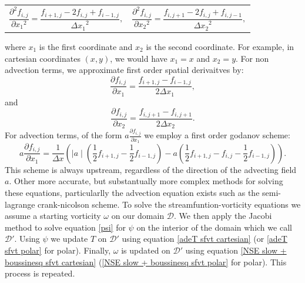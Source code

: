 \documentclass{article}
\begin{document}
\begin{tabularx}{\textwidth}{XX}
\begin{equation}
	\frac{\partial^2 f_{i,j}}{\partial {x_1}^2} = \frac{f_{i+1,j} - 2 f_{i,j} + f_{i-1,j}}{{\Delta x_1}^2},
\end{equation}
    &
\begin{equation}
	\frac{\partial^2 f_{i,j}}{\partial {x_2}^2} = \frac{f_{i,j+1} - 2 f_{i,j} + f_{i,j-1}}{{\Delta x_2}^2},
\end{equation}
\end{tabularx}\par
where $x_1$ is the first coordinate and $x_2$ is the second coordinate. For example, in cartesian coordinates $(x,y)$, we would have $x_1=x$ and $x_2=y$. 
For non advection terms, we approximate first order spatial derivaitves by:
\begin{equation}
	\frac{\partial f_{i,j}}{\partial x_1} = \frac{f_{i+1,j} - f_{i-1,j}}{2{\Delta x_1}},
\end{equation}
and
\begin{equation}
	\frac{\partial f_{i,j}}{\partial x_2} = \frac{f_{i,j+1} - f_{i,j+1}}{2{\Delta x_2}}.
\end{equation}
For advection terms, of the form $a \frac{\partial f_{i,j}}{\partial x_1}$ we employ a first order godanov scheme:
\begin{equation}
	a \frac{\partial f_{i,j}}{\partial x_1} = \frac{1}{\Delta x} ( \mid a\mid (  \frac{1}{2} f_{i+1,j} - \frac{1}{2} f_{i-1,j}   ) - a ( \frac{1}{2} f_{i+1,j} -f_{i,j} - \frac{1}{2} f_{i-1,j} )).
\end{equation}
This scheme is always upstream, regardless of the direction of the advecting field $a$.
\newline
Other more accurate, but substantually more complex methods for solving these equations, particularlly the advection equation exists such as the semi-lagrange crank-nicolson scheme.
\newline
To solve the streamfuntion-vorticity equations we assume a starting vorticity $\omega$ on our domain $\mathcal{D}$. We then apply the Jacobi method to solve equation \ref{psi} for $\psi$ on the interior of the domain which we call $\mathcal{D}'$. 
Using $\psi$ we update $T$ on $\mathcal{D}'$ using equation \ref{adeT sfvt cartesian} (or \ref{adeT sfvt polar} for polar). Finally, $\omega$ is updated on $\mathcal{D}'$ using 
equation \ref{NSE slow + boussinesq sfvt cartesian} (\ref{NSE slow + boussinesq sfvt polar} for polar). This process is repeated.
\end{document}
